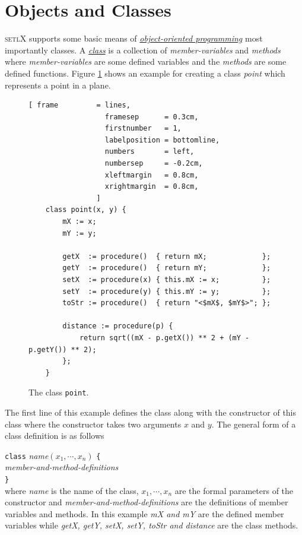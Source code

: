 \documentclass[11pt]{report}
\begin{document}
\section{Objects and Classes}
\textsc{setlX} supports some basic means of \href{http://en.wikipedia.org/wiki/Object-oriented_programming}{\emph{object-oriented programming}} most importantly classes. A \href{http://en.wikipedia.org/wiki/Class_(computer_programming)}{\emph{class}} is a collection of \textsl{member-variables} and \textsl{methods} where \textsl{member-variables} are some defined variables and the \textsl{methods} are some defined functions. Figure \ref{fig:point.stlx} shows an example for creating a class \textsl{point} which represents a point in a plane.

\begin{figure}[!ht]
\centering
\begin{Verbatim}[ frame         = lines, 
                  framesep      = 0.3cm, 
                  firstnumber   = 1,
                  labelposition = bottomline,
                  numbers       = left,
                  numbersep     = -0.2cm,
                  xleftmargin   = 0.8cm,
                  xrightmargin  = 0.8cm,
                ]
    class point(x, y) {
        mX := x;
        mY := y;
    
        getX  := procedure()  { return mX;             };
        getY  := procedure()  { return mY;             };
        setX  := procedure(x) { this.mX := x;          };
        setY  := procedure(y) { this.mY := y;          };
        toStr := procedure()  { return "<$mX$, $mY$>"; };

        distance := procedure(p) {
            return sqrt((mX - p.getX()) ** 2 + (mY - p.getY()) ** 2);
        };
    }
\end{Verbatim}
\vspace*{-0.3cm}
\caption{The class \texttt{point}.}
\label{fig:point.stlx}
\end{figure}

The first line of this example defines the class along with the constructor of this class where the constructor takes two arguments $x$ and $y$. The general form of a class definition is as follows

\vspace{0.2cm}
\hspace*{0.8cm}
\texttt{class} \textsl{name}$(x_1, \cdots, x_n)$ \texttt{\{}  
\\
\hspace*{2.0cm} \textsl{member-and-method-definitions}
\\
\hspace*{1.3cm}
\texttt{\}}
\\[0.2cm]
where \textsl{name} is the name of the class, $x_1, \cdots, x_n$ are the formal parameters of the constructor and \textsl{member-and-method-definitions} are the definitions of member variables and methods. In this example \textsl{mX and mY} are the defined member variables while \textsl{getX, getY, setX, setY, toStr and distance} are the class methods.
\end{document}
